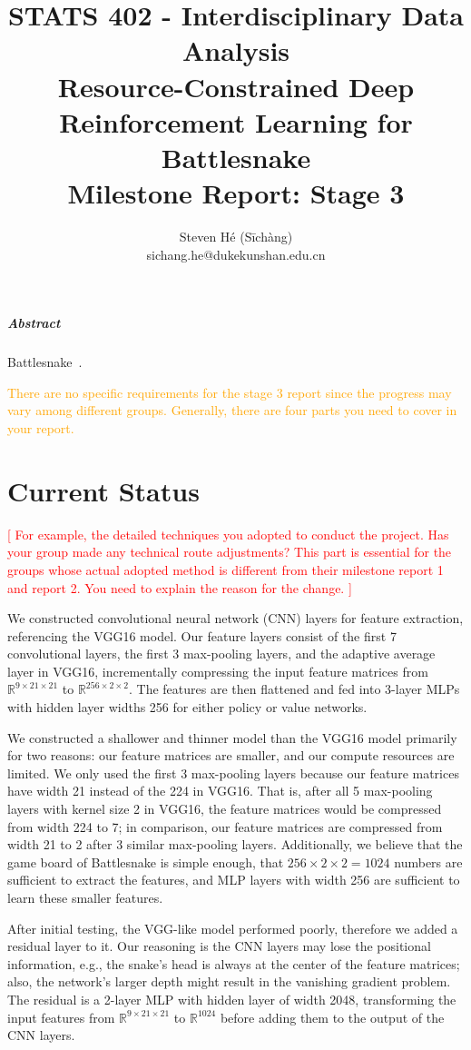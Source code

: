 \documentclass[a4paper]{article}
\title{STATS 402 - Interdisciplinary Data Analysis\\
    Resource-Constrained Deep Reinforcement Learning for Battlesnake\\
    Milestone Report: Stage 3
}
\author{Steven Hé (Sīchàng)\\
    sichang.he@dukekunshan.edu.cn
}
\newcommand{\todo}[1]{\textcolor{red}{[ #1 ]}}
\newcommand{\instruction}[1]{\textcolor{orange}{#1}}
\begin{document}
\maketitle

\subparagraph{Abstract}

Battlesnake~\cite{battlesnake}.

\instruction{
    There are no specific requirements for the stage 3 report since the progress
    may vary among different groups. Generally,
    there are four parts you need to cover in your report.
}

\section{Current Status}

\todo{
    For example, the detailed techniques you adopted to conduct the project.
    Has your group made any technical route adjustments?
    This part is essential for the groups whose actual adopted method is
    different from their milestone report 1 and report 2.
    You need to explain the reason for the change.
}

We constructed convolutional neural network (CNN) layers for feature extraction,
referencing the VGG16 model.
Our feature layers consist of the first 7 convolutional layers,
the first 3 max-pooling layers, and the adaptive average layer in VGG16,
incrementally compressing the input feature matrices from $\mathbb R^{9\times
            21\times 21}$ to $\mathbb R^{256\times 2\times 2}$.
The features are then flattened and fed into 3-layer MLPs with hidden layer
widths 256 for either policy or value networks.

We constructed a shallower and thinner model than the VGG16 model primarily for
two reasons: our feature matrices are smaller,
and our compute resources are limited.
We only used the first 3 max-pooling layers because our feature matrices have
width 21 instead of the 224 in VGG16. That is,
after all 5 max-pooling layers with kernel size 2 in VGG16,
the feature matrices would be compressed from width 224 to 7; in comparison,
our feature matrices are compressed from width 21 to 2 after 3 similar
max-pooling layers.
Additionally, we believe that the game board of Battlesnake is simple enough,
that $256\times 2\times 2=1024$ numbers are sufficient to extract the features,
and MLP layers with width 256 are sufficient to learn these smaller features.

After initial testing, the VGG-like model performed poorly,
therefore we added a residual layer to it.
Our reasoning is the CNN layers may lose the positional information,
e.g., the snake's head is always at the center of the feature matrices;
also, the network's larger depth might result in the vanishing gradient problem.
The residual is a 2-layer MLP with hidden layer of width 2048,
transforming the input features from $\mathbb R^{9\times 21\times 21}$ to
$\mathbb R^{1024}$ before adding them to the output of the CNN layers.
\end{document}
